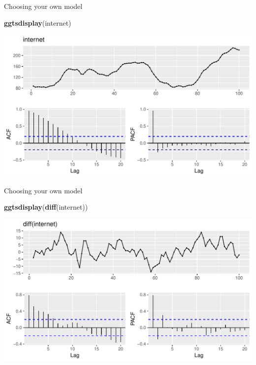 \documentclass[14pt,ignorenonframetext,]{beamer}
\newenvironment{Shaded}{\begin{snugshade}}{\end{snugshade}}
\newcommand{\KeywordTok}[1]{\textcolor[rgb]{0.13,0.29,0.53}{\textbf{#1}}}
\newcommand{\NormalTok}[1]{#1}
\begin{document}
\begin{frame}[fragile]{Choosing your own model}

\begin{Shaded}
\begin{Highlighting}[]
\KeywordTok{ggtsdisplay}\NormalTok{(internet)}
\end{Highlighting}
\end{Shaded}

\includegraphics{week_5_arima_files/figure-beamer/unnamed-chunk-31-1.pdf}

\end{frame}

\begin{frame}[fragile]{Choosing your own model}

\begin{Shaded}
\begin{Highlighting}[]
\KeywordTok{ggtsdisplay}\NormalTok{(}\KeywordTok{diff}\NormalTok{(internet))}
\end{Highlighting}
\end{Shaded}

\includegraphics{week_5_arima_files/figure-beamer/unnamed-chunk-32-1.pdf}

\end{frame}
\end{document}
